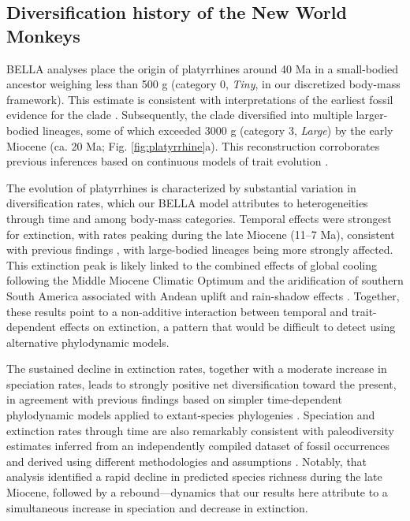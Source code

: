 \subsection{Diversification history of the New World Monkeys}

BELLA analyses place the origin of platyrrhines around 40 Ma in a small-bodied ancestor weighing less than 500 g (category 0, \textit{Tiny}, in our discretized body-mass framework). This estimate is consistent with interpretations of the earliest fossil evidence for the clade \citep{bond2015eocene}.
Subsequently, the clade diversified into multiple larger-bodied lineages, some of which exceeded 3000 g (category 3, \textit{Large}) by the early Miocene (ca. 20 Ma; Fig. \ref{fig:platyrrhine}a).
This reconstruction corroborates previous inferences based on continuous models of trait evolution \citep{silvestro2019early}.

The evolution of platyrrhines is characterized by substantial variation in diversification rates, which our BELLA model attributes to heterogeneities through time and among body-mass categories.
Temporal effects were strongest for extinction, with rates peaking during the late Miocene (11–7 Ma), consistent with previous findings \citep{silvestro2019early}, with large-bodied lineages being more strongly affected.
This extinction peak is likely linked to the combined effects of global cooling following the Middle Miocene Climatic Optimum and the aridification of southern South America associated with Andean uplift and rain-shadow effects \citep{hoorn2022editorial}.
Together, these results point to a non-additive interaction between temporal and trait-dependent effects on extinction, a pattern that would be difficult to detect using alternative phylodynamic models.

The sustained decline in extinction rates, together with a moderate increase in speciation rates, leads to strongly positive net diversification toward the present, in agreement with previous findings based on simpler time-dependent phylodynamic models applied to extant-species phylogenies \citep{herrera2017primate}.
Speciation and extinction rates through time are also remarkably consistent with paleodiversity estimates inferred from an independently compiled dataset of fossil occurrences and derived using different methodologies and assumptions \citep{pino2025splendid}.
Notably, that analysis identified a rapid decline in predicted species richness during the late Miocene, followed by a rebound—dynamics that our results here attribute to a simultaneous increase in speciation and decrease in extinction.

